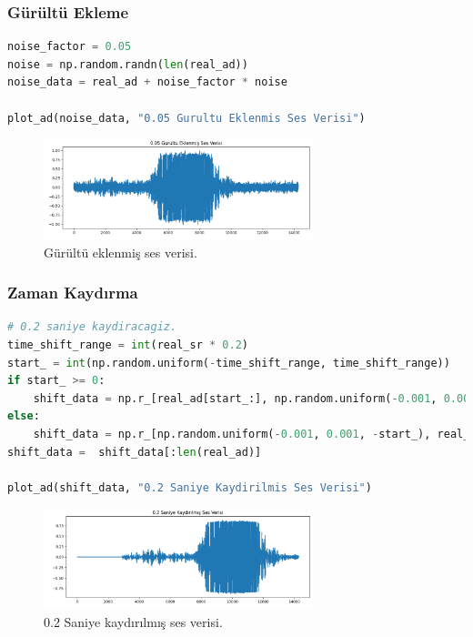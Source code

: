 \subsubsection{Gürültü Ekleme}

\begin{lstlisting}[language=Python]
noise_factor = 0.05
noise = np.random.randn(len(real_ad))
noise_data = real_ad + noise_factor * noise

plot_ad(noise_data, "0.05 Gurultu Eklenmis Ses Verisi")
\end{lstlisting}

\begin{figure}[h]
    \centering
    \includegraphics[width=0.7\textwidth]{images/sound_aug_02.png}
    \caption{Gürültü eklenmiş ses verisi.}
    \label{fig:enter-label}
\end{figure}

\newpage

\subsubsection{Zaman Kaydırma}

\begin{lstlisting}[language=Python]
# 0.2 saniye kaydiracagiz.
time_shift_range = int(real_sr * 0.2)
start_ = int(np.random.uniform(-time_shift_range, time_shift_range))
if start_ >= 0:
    shift_data = np.r_[real_ad[start_:], np.random.uniform(-0.001, 0.001, start_)]
else:
    shift_data = np.r_[np.random.uniform(-0.001, 0.001, -start_), real_ad[:start_]]
shift_data =  shift_data[:len(real_ad)]

plot_ad(shift_data, "0.2 Saniye Kaydirilmis Ses Verisi")
\end{lstlisting}

\begin{figure}[h]
    \centering
    \includegraphics[width=0.7\textwidth]{images/sound_aug_03.png}
    \caption{0.2 Saniye kaydırılmış ses verisi.}
    \label{fig:enter-label}
\end{figure}


